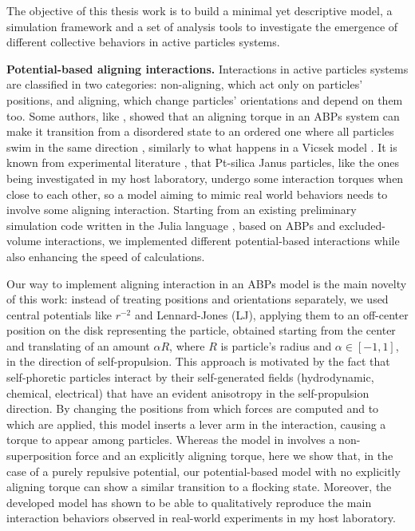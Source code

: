 \documentclass[a4paper, notitlepage]{report} %
\begin{document}
	The objective of this thesis work is to build a minimal yet descriptive model, a simulation framework and a set of analysis tools to investigate the emergence of different collective behaviors in active particles systems.
	
	\textbf{Potential-based aligning interactions.}
	Interactions in active particles systems are classified in two categories: non-aligning, which act only on particles' positions, and aligning, which change particles' orientations and depend on them too.
	Some authors, like \citeauthor{martin-gomez_collective_2018}, showed that an aligning torque in an ABPs system can make it transition from a disordered state to an ordered one where all particles swim in the same direction \cite{martin-gomez_collective_2018}, similarly to what happens in a Vicsek model \cite{vicsek_novel_1995}.
	It is known from experimental literature \cite{singh_pair_2024}, that Pt-silica Janus particles, like the ones being investigated in my host laboratory, undergo some interaction torques when close to each other, so a model aiming to mimic real world behaviors needs to involve some aligning interaction.
	Starting from an existing preliminary simulation code written in the Julia language \cite{julia}, based on ABPs and excluded-volume interactions, we implemented different potential-based interactions while also enhancing the speed of calculations.
	
	Our way to implement aligning interaction in an ABPs model is the main novelty of this work: instead of treating positions and orientations separately, we used central potentials like $r^{-2}$ and Lennard-Jones (LJ), applying them to an off-center position on the disk representing the particle, obtained starting from the center and translating of an amount $\alpha R$, where $R$ is particle's radius and $\alpha \in [-1,1]$, in the direction of self-propulsion.
	This approach is motivated by the fact that self-phoretic particles interact by their self-generated fields (hydrodynamic, chemical, electrical) that have an evident anisotropy in the self-propulsion direction.
	By changing the positions from which forces are computed and to which are applied, this model inserts a lever arm in the interaction, causing a torque to appear among particles.
	Whereas the model in \cite{martin-gomez_collective_2018} involves a non-superposition force and an explicitly aligning torque, here we show that, in the case of a purely repulsive potential, our potential-based model with no explicitly aligning torque can show a similar transition to a flocking state.
	Moreover, the developed model has shown to be able to qualitatively reproduce the main interaction behaviors observed in real-world experiments in my host laboratory.
	
\end{document}
